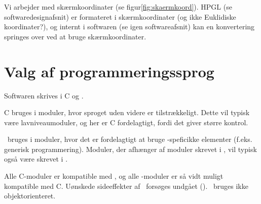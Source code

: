 
Vi arbejder med skærmkoordinater (se
figur\vref{fig:skaermkoord}). HPGL (se
softwaredesignafsnit) er formateret i
skærmkoordinater (og ikke Euklidiske koordinater?),
og internt i softwaren (se igen
softwareafsnit) kan en konvertering
springes over ved at bruge skærmkoordinater.


\section{Valg af programmeringssprog}

Softwaren skrives i C og \Cpp.

C bruges i moduler, hvor sproget uden videre er tilstrækkeligt. Dette
vil typisk være lavniveaumoduler, og her er C fordelagtigt, fordi det
giver større kontrol.

\Cpp\ bruges i moduler, hvor det er fordelagtigt at bruge
\Cpp-speficikke elementer (f.eks. generisk programmering). Moduler, der afhænger af moduler skrevet i \Cpp, vil
typisk også være skrevet i \Cpp.

Alle C-moduler er kompatible med \Cpp, og alle \Cpp-moduler er så vidt
muligt kompatible med C. Uønskede sideeffekter af \Cpp\ forsøges
undgået (). \Cpp\ bruges ikke objektorienteret.



